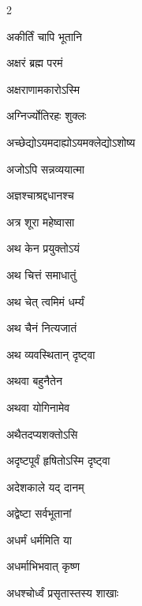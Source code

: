 \begin{multicols}{2}

\begin{indexlist}
\item अकीर्तिं चापि भूतानि \dotfill {}
\item अक्षरं ब्रह्म परमं \dotfill {}
\item अक्षराणामकारोऽस्मि \dotfill {}
\item अग्निर्ज्योतिरहः शुक्लः \dotfill {}
\item अच्छेद्योऽयमदाह्योऽयमक्लेद्योऽशोष्य \dotfill {}
\item अजोऽपि सन्नव्ययात्मा \dotfill {}
\item अज्ञश्चाश्रद्दधानश्च \dotfill {}
\item अत्र शूरा महेष्वासा \dotfill {}
\item अथ केन प्रयुक्तोऽयं \dotfill {}
\item अथ चित्तं समाधातुं \dotfill {}
\item अथ चेत् त्वमिमं धर्म्यं \dotfill {}
\item अथ चैनं नित्यजातं \dotfill {}
\item अथ व्यवस्थितान् दृष्ट्वा \dotfill {}
\item अथवा बहुनैतेन \dotfill {}
\item अथवा योगिनामेव \dotfill {}
\item अथैतदप्यशक्तोऽसि \dotfill {}
\item अदृष्टपूर्वं हृषितोऽस्मि दृष्ट्वा \dotfill {}
\item अदेशकाले यद् दानम् \dotfill {}
\item अद्वेष्टा सर्वभूतानां \dotfill {}
\item अधर्मं धर्ममिति या \dotfill {}
\item अधर्माभिभवात् कृष्ण \dotfill {}
\item अधश्चोर्ध्वं प्रसृतास्तस्य शाखाः \dotfill {}

\end{indexlist}
\end{multicols}
